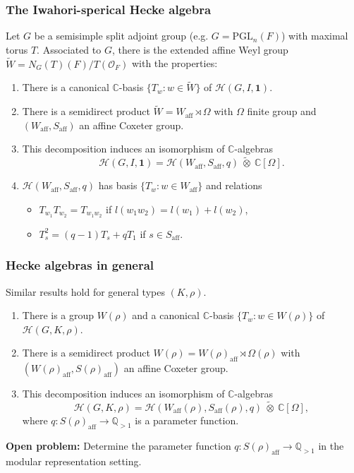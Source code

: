 \documentclass{beamer}
\newcommand{\PGL}{\mathrm{PGL}}
\newcommand{\aff}{\mathrm{aff}}
\newcommand{\CC}{\mathbb{C}}
\newcommand{\QQ}{\mathbb{Q}}
\newcommand{\cH}{\mathcal{H}}
\theoremstyle{plain}
\begin{document}
\begin{frame}
    \frametitle{The Iwahori-sperical Hecke algebra}
    Let $G$ be a semisimple split adjoint group (e.g. $G=\PGL_n(F)$) with maximal torus $T$. \pause
    Associated to $G$, there is the extended affine Weyl group $\widetilde{W}=N_G(T)(F)/T(\mathcal{O}_F)$ with the properties:\pause
    \begin{enumerate}
        \item There is a canonical $\CC$-basis $\{T_w:w\in\widetilde{W}\}$ of $\cH(G,I,\mathbf{1})$.\pause
        \item There is a semidirect product $\widetilde{W}=W_{\aff}\rtimes\Omega$ with $\Omega$ finite group and $(W_{\aff},S_{\aff})$ an affine Coxeter group. \pause
        \item This decomposition induces an isomorphism of $\CC$-algebras
        \[\cH(G,I,\mathbf{1})=\cH(W_{\aff},S_{\aff},q)\ \tilde{\otimes}\ \CC[\Omega].\] \pause
        \item $\cH(W_{\aff},S_{\aff},q)$ has basis $\{T_w:w\in W_{\aff}\}$ and relations
        \begin{itemize}
            \item $T_{w_1}T_{w_2}=T_{w_1w_2}$ if $l(w_1w_2)=l(w_1)+l(w_2)$,
            \item $T_s^2=(q-1)T_s+qT_1$ if $s\in S_{\aff}$.
        \end{itemize}
    \end{enumerate}
\end{frame}

\begin{frame}
    \frametitle{Hecke algebras in general}
    Similar results hold for general types $(K,\rho)$. \pause
    \begin{enumerate}
        \item There is a group $W(\rho)$ and a canonical $\CC$-basis $\{T_w:w\in W(\rho)\}$ of $\cH(G,K,\rho)$. \pause
        \item There is a semidirect product $W(\rho)=W(\rho)_{\aff}\rtimes\Omega(\rho)$ with $(W(\rho)_{\aff},S(\rho)_{\aff})$ an affine Coxeter group. \pause
        \item This decomposition induces an isomorphism of $\CC$-algebras
        \[\cH(G,K,\rho)=\cH(W_{\aff}(\rho),S_{\aff}(\rho),q)\ \tilde{\otimes}\ \CC[\Omega],\]
        where $q:S(\rho)_{\aff}\rightarrow\QQ_{>1}$ is a parameter function.
    \end{enumerate}
    \vspace{0.3cm}\pause
    \textbf{Open problem:} Determine the parameter function $q:S(\rho)_{\aff}\rightarrow\QQ_{>1}$ in the modular representation setting. 
\end{frame}
\end{document}
